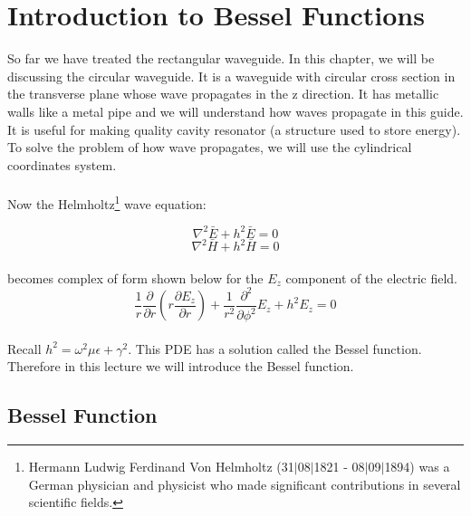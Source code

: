 	\chapter{Introduction to Bessel Functions}
	So far we have treated the rectangular waveguide. In this chapter, we will be discussing the circular waveguide. It is a waveguide with circular cross section in the transverse plane whose wave propagates in the z direction. It has metallic walls like a metal pipe and we will understand how waves propagate in this guide. It is useful for making quality cavity resonator (a structure used to store energy). To solve the problem of how wave propagates, we will use the cylindrical coordinates system.
	\\\\
	Now the Helmholtz\footnote{Hermann Ludwig Ferdinand Von Helmholtz (31$|$08$|$1821 - 08$|$09$|$1894) was a German physician and physicist who made significant contributions in several scientific fields.}  wave equation:
	
	$$\nabla^2 \bar{E} + h^2 \bar{E} = 0 $$
	$$\nabla^2 \bar{H} + h^2 \bar{H} = 0 $$
	\\
	becomes complex of form shown below for the $E_z$ component of the electric field.
	$$\frac{1}{r} \frac{\partial}{\partial r} (r \frac{\partial E_z}{\partial r}) + \frac{1}{r^2} \frac{\partial^2}{\partial \phi ^2}E_z + h^2 E_z = 0 $$
	\\
	Recall $h^2 = \omega^2 \mu \epsilon + \gamma^2$. This PDE has a solution called the Bessel function. Therefore in this lecture we will introduce the Bessel function.
	\section{Bessel Function}
	
